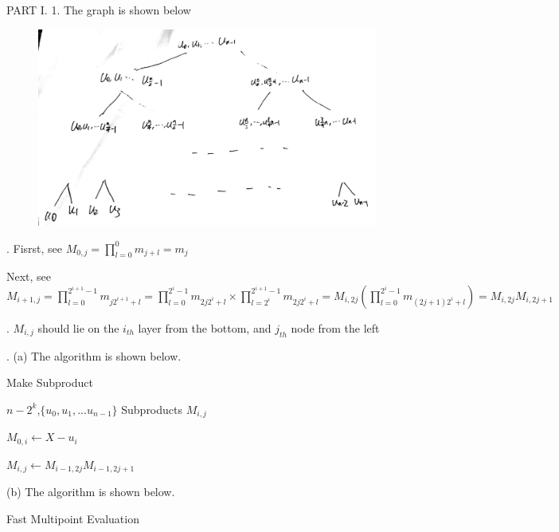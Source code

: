 \documentclass{article}
\begin{document}
{ PART I. 1. The graph is shown below\\

\begin{figure}[h]
    \centering
    \includegraphics[scale=0.1]{1.jpg}
\end{figure}

{. Fisrst, see $M_{0,j} = \prod_{l=0}^0m_{j+l} = m_j$}

Next, see $M_{i+1,j} = \prod_{l=0}^{2^{i+1}-1}m_{j{2^{i+1}}+l} = \prod_{l=0}^{2^i-1}m_{2j2^i+l}\times \prod_{l=2^i}^{2^{i+1}-1}m_{2j2^i+l} = M_{i,2j}(\prod_{l=0}^{2^i-1}m_{(2j+1)2^i+l}) = M_{i,2j}M_{i,2j+1}$


{. $M_{i,j}$ should lie on the $i_{th}$ layer from the bottom, and $j_{th}$ node from the left\\}

{. (a) The algorithm is shown below.}

\begin{algorithm}[H]
    \caption{Make Subproduct}  
    \begin{algorithmic}[1] 

        \Require $n-2^k$,$\{u_0,u_1,...u_{n-1}\}$
        \Ensure Subproducts $M_{i,j}$

            \State $M_{0,i}\gets X-u_i$
        \EndFor

            \State $M_{i,j}\gets M_{i-1,2j}M_{i-1,2j+1}$
            \EndFor
        \EndFor
    \end{algorithmic}  
\end{algorithm}

{\noindent (b) The algorithm is shown below.}
\begin{algorithm}[H]
    \caption{Fast Multipoint Evaluation}  
    \begin{algorithmic}[1] 


\end{algorithmic}
\end{algorithm}}
\end{document}
